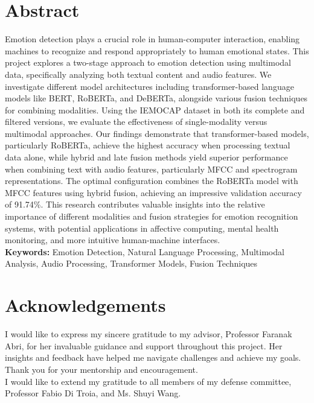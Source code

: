\documentclass[12pt]{article}
\begin{document}

\doublespacing
\section*{Abstract}
\bigskip
Emotion detection plays a crucial role in human-computer interaction, enabling machines to recognize and respond appropriately to human emotional states. This project explores a two-stage approach to emotion detection using multimodal data, specifically analyzing both textual content and audio features. We investigate different model architectures including transformer-based language models like BERT, RoBERTa, and DeBERTa, alongside various fusion techniques for combining modalities. Using the IEMOCAP dataset in both its complete and filtered versions, we evaluate the effectiveness of single-modality versus multimodal approaches. Our findings demonstrate that transformer-based models, particularly RoBERTa, achieve the highest accuracy when processing textual data alone, while hybrid and late fusion methods yield superior performance when combining text with audio features, particularly MFCC and spectrogram representations. The optimal configuration combines the RoBERTa model with MFCC features using hybrid fusion, achieving an impressive validation accuracy of 91.74\%. This research contributes valuable insights into the relative importance of different modalities and fusion strategies for emotion recognition systems, with potential applications in affective computing, mental health monitoring, and more intuitive human-machine interfaces.\\

\noindent \textbf{Keywords:} Emotion Detection, Natural Language Processing, Multimodal Analysis, Audio Processing, Transformer Models, Fusion Techniques
\newpage
\section*{Acknowledgements}
I would like to express my sincere gratitude to my advisor, Professor Faranak Abri, for her invaluable guidance and support throughout this project. Her insights and feedback have helped me navigate challenges and achieve my goals. Thank you for your mentorship and encouragement.\\
  
\noindent
I would like to extend my gratitude to all members of my defense committee, Professor Fabio Di Troia, and Ms. Shuyi Wang.\\
\end{document}
